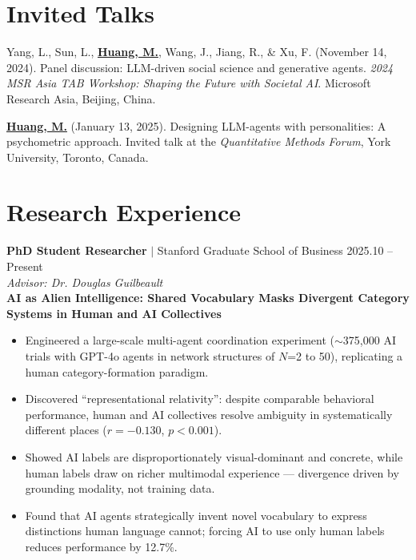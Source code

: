 \documentclass[11pt,letterpaper]{article}
\newcommand{\myname}[1]{\textbf{\uline{#1}}}
\newcommand{\project}[1]{\textbf{\textcolor{black!80}{#1}}}
\newcommand{\advisor}[1]{\textit{Advisor: #1}}
\begin{document}
\section*{Invited Talks}

\begin{enumerate}[label={[\arabic*]}]
    \item Yang, L., Sun, L., \myname{Huang, M.}, Wang, J., Jiang, R., \& Xu, F. (November 14, 2024). Panel discussion: LLM-driven social science and generative agents. \textit{2024 MSR Asia TAB Workshop: Shaping the Future with Societal AI}. Microsoft Research Asia, Beijing, China.

    \item \myname{Huang, M.} (January 13, 2025). Designing LLM-agents with personalities: A psychometric approach. Invited talk at the \textit{Quantitative Methods Forum}, York University, Toronto, Canada.
\end{enumerate}

\section*{Research Experience}

\noindent\textbf{PhD Student Researcher} $|$ Stanford Graduate School of Business \hfill 2025.10 -- Present\\
\noindent\advisor{Dr. Douglas Guilbeault}\\[0.3em]
\noindent\project{AI as Alien Intelligence: Shared Vocabulary Masks Divergent Category Systems in Human and AI Collectives}
\begin{itemize}
    \item Engineered a large-scale multi-agent coordination experiment ($\sim$375,000 AI trials with GPT-4o agents in network structures of $N$=2 to 50), replicating a human category-formation paradigm.
    \item Discovered ``representational relativity'': despite comparable behavioral performance, human and AI collectives resolve ambiguity in systematically different places ($r = -0.130$, $p < 0.001$).
    \item Showed AI labels are disproportionately visual-dominant and concrete, while human labels draw on richer multimodal experience --- divergence driven by grounding modality, not training data.
    \item Found that AI agents strategically invent novel vocabulary to express distinctions human language cannot; forcing AI to use only human labels reduces performance by 12.7\%.
\end{itemize}
\end{document}
